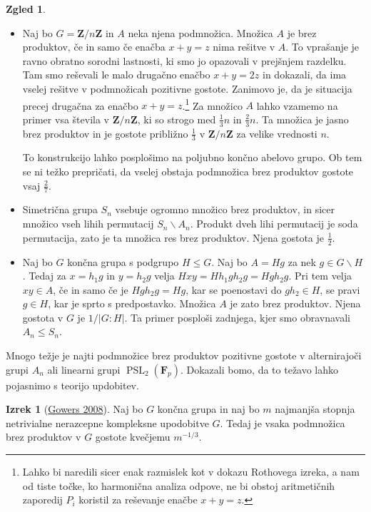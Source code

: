\documentclass[11pt]{book}
\def\ZZ{\mathbf{Z}}
\def\FF{\mathbf{F}}
\DeclareMathOperator\PSL{PSL}
\theoremstyle{definition}
\theoremstyle{zgled}
\newtheorem*{zgled}{Zgled}
\theoremstyle{odprtproblem}
\theoremstyle{domacanaloga}
\theoremstyle{izrek}
\newtheorem*{izrek}{Izrek}
\begin{document}
\begin{zgled} \leavevmode
\begin{itemize}
\item Naj bo $G = \ZZ/n\ZZ$ in $A$ neka njena podmnožica. Množica $A$ je brez produktov, če in samo če enačba $x+y=z$ nima rešitve v $A$. To vprašanje je ravno obratno sorodni lastnosti, ki smo jo opazovali v prejšnjem razdelku. Tam smo reševali le malo drugačno enačbo $x+y=2z$ in dokazali, da ima vselej rešitve v podmnožicah pozitivne gostote. Zanimovo je, da je situacija precej drugačna za enačbo $x+y = z$.\footnote{Lahko bi naredili sicer enak razmislek kot v dokazu Rothovega izreka, a nam od tiste točke, ko harmonična analiza odpove, ne bi obstoj aritmetičnih zaporedij $P_i$ koristil za reševanje enačbe $x+y=z$.} Za množico $A$ lahko vzamemo na primer vsa števila v $\ZZ/n\ZZ$, ki so strogo med $\frac{1}{3}n$ in $\frac{2}{3}n$. Ta množica je jasno brez produktov in je gostote približno $\frac{1}{3}$ v $\ZZ/n\ZZ$ za velike vrednosti $n$. 

To konstrukcijo lahko posplošimo na poljubno končno abelovo grupo. Ob tem se ni težko prepričati, da vselej obstaja podmnožica brez produktov gostote vsaj $\frac{2}{7}$.

\item Simetrična grupa $S_n$ vsebuje ogromno množico brez produktov, in sicer množico vseh lihih permutacij $S_n \backslash A_n$. Produkt dveh lihi permutacij je soda permutacija, zato je ta množica res brez produktov. Njena gostota je $\frac12$.

\item Naj bo $G$ končna grupa s podgrupo $H \leq G$. Naj bo $A = Hg$ za nek $g \in G \backslash H$. Tedaj za $x = h_1 g$ in $y = h_2 g$ velja $Hxy = Hh_1 g h_2 g = H g h_2 g$. Pri tem velja $xy \in A$, če in samo če je $H g h_2 g = Hg$, kar se poenostavi do $g h_2 \in H$, se pravi $g \in H$, kar je sprto s predpostavko. Množica $A$ je zato brez produktov. Njena gostota v $G$ je $1/|G:H|$. Ta primer posploši zadnjega, kjer smo obravnavali $A_n \leq S_n$.
\end{itemize}
\end{zgled}

Mnogo težje je najti podmnožice brez produktov pozitivne gostote v alternirajoči grupi $A_n$ ali linearni grupi $\PSL_2(\FF_p)$. Dokazali bomo, da to težavo lahko pojasnimo s teorijo updobitev.

\begin{izrek}[\href{https://www.cambridge.org/core/journals/combinatorics-probability-and-computing/article/abs/quasirandom-groups/A885920D04E04BC63766C052C666931A}{Gowers 2008}]
Naj bo $G$ končna grupa in naj bo $m$ najmanjša stopnja netrivialne nerazcepne kompleksne upodobitve $G$. Tedaj je vsaka podmnožica brez produktov v $G$ gostote kvečjemu $m^{-1/3}$.
\end{izrek}
\end{document}
